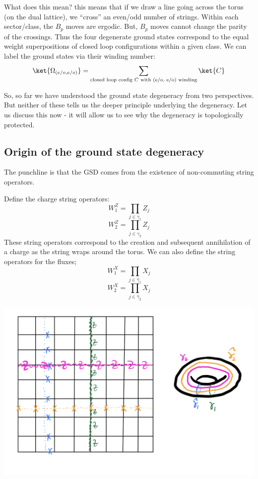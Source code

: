 What does this mean? this means that if we draw a line going across the torus (on the dual lattice), we ``cross'' an even/odd number of strings. Within each sector/class, the $B_p$ moves are ergodic. But, $B_p$ moves cannot change the parity of the crossings. Thus the four degenerate ground states correspond to the equal weight superpositions of closed loop configurations within a given class. We can label the ground states via their winding number:
\begin{equation}
    \ket{\Omega_{(e/o, e/o)}} = \sum_{\text{closed loop config $C$ with (e/o, e/o) winding}}\ket{C}
\end{equation}

So, so far we have understood the ground state degeneracy from two perspectives. But neither of these tells us the deeper principle underlying the degeneracy. Let us discuss this now - it will allow us to see why the degeneracy is topologically protected.

\subsection{Origin of the ground state degeneracy}
The punchline is that the GSD comes from the existence of non-commuting string operators.

Define the charge string operators:
\begin{equation}
    W_1^Z = \prod_{j \in \gamma_1}Z_j
\end{equation}
\begin{equation}
    W_2^Z = \prod_{j \in \gamma_2}Z_j
\end{equation}
These string operators correspond to the creation and subsequent annihilation of a charge as the string wraps around the torus. We can also define the string operators for the fluxes;
\begin{equation}
    W_1^X = \prod_{j \in \hat{\gamma}_1}X_j
\end{equation}
\begin{equation}
    W_2^X = \prod_{j \in \hat{\gamma}_2}X_j
\end{equation}

\begin{center}
    \includegraphics[scale=0.4]{Lectures/Images/lec2-torusstrings.png}
\end{center}


